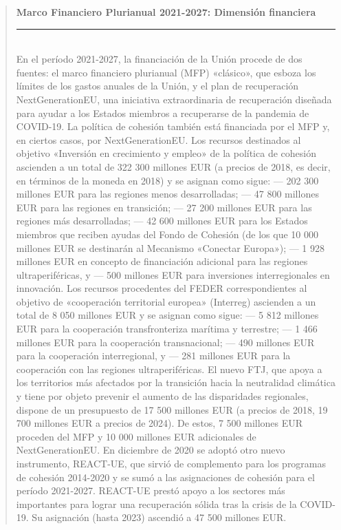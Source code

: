 \documentclass[10pt,a4paper]{article}
\newenvironment{specialblock}[1]{%
      \begin{quote} %
      \small %
      \noindent\textbf{#1}\\[-0.3em] %
      \rule{\linewidth}{0.4pt}\\[0.6em]}{
      \end{quote}}
\begin{document}
\begin{specialblock}{Marco Financiero Plurianual 2021-2027: Dimensión financiera}     
    En el período 2021-2027, la financiación de la Unión procede de dos fuentes: el marco financiero plurianual (MFP) «clásico», que esboza los límites de los gastos anuales de la Unión, y el plan de recuperación NextGenerationEU, una iniciativa extraordinaria de recuperación diseñada para ayudar a los Estados miembros a recuperarse de la pandemia de COVID-19. La política de cohesión también está financiada por el MFP y, en ciertos casos, por NextGenerationEU. Los recursos destinados al objetivo «Inversión en crecimiento y empleo» de la política de cohesión ascienden a un total de 322 300 millones EUR (a precios de 2018, es decir, en términos de la moneda en 2018) y se asignan como sigue: — 202 300 millones EUR para las regiones menos desarrolladas; — 47 800 millones EUR para las regiones en transición; — 27 200 millones EUR para las regiones más desarrolladas; — 42 600 millones EUR para los Estados miembros que reciben ayudas del Fondo de Cohesión (de los que 10 000 millones EUR se destinarán al Mecanismo «Conectar Europa»); — 1 928 millones EUR en concepto de financiación adicional para las regiones ultraperiféricas, y — 500 millones EUR para inversiones interregionales en innovación. Los recursos procedentes del FEDER correspondientes al objetivo de «cooperación territorial europea» (Interreg) ascienden a un total de 8 050 millones EUR y se asignan como sigue: — 5 812 millones EUR para la cooperación transfronteriza marítima y terrestre; — 1 466 millones EUR para la cooperación transnacional; — 490 millones EUR para la cooperación interregional, y — 281 millones EUR para la cooperación con las regiones ultraperiféricas. El nuevo FTJ, que apoya a los territorios más afectados por la transición hacia la neutralidad climática y tiene por objeto prevenir el aumento de las disparidades regionales, dispone de un presupuesto de 17 500 millones EUR (a precios de 2018, 19 700 millones EUR a precios de 2024). De estos, 7 500 millones EUR proceden del MFP y 10 000 millones EUR adicionales de NextGenerationEU. En diciembre de 2020 se adoptó otro nuevo instrumento, REACT-UE, que sirvió de complemento para los programas de cohesión 2014-2020 y se sumó a las asignaciones de cohesión para el período 2021-2027. REACT-UE prestó apoyo a los sectores más importantes para lograr una recuperación sólida tras la crisis de la COVID-19. Su asignación (hasta 2023) ascendió a 47 500 millones EUR.


\end{specialblock}
\end{document}
